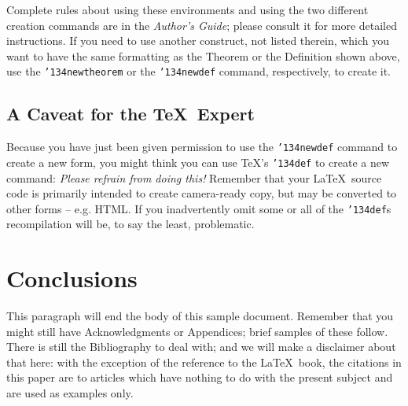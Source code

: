 \documentclass{sig-alternate}
\begin{document}
Complete rules about using these environments and using the
two different creation commands are in the
\textit{Author's Guide}; please consult it for more
detailed instructions.  If you need to use another construct,
not listed therein, which you want to have the same
formatting as the Theorem
or the Definition\cite{salas:calculus} shown above,
use the \texttt{{\char'134}newtheorem} or the
\texttt{{\char'134}newdef} command,
respectively, to create it.

\subsection*{A {\secit Caveat} for the \TeX\ Expert}
Because you have just been given permission to
use the \texttt{{\char'134}newdef} command to create a
new form, you might think you can
use \TeX's \texttt{{\char'134}def} to create a
new command: \textit{Please refrain from doing this!}
Remember that your \LaTeX\ source code is primarily intended
to create camera-ready copy, but may be converted
to other forms -- e.g. HTML. If you inadvertently omit
some or all of the \texttt{{\char'134}def}s recompilation will
be, to say the least, problematic.

\section{Conclusions}
This paragraph will end the body of this sample document.
Remember that you might still have Acknowledgments or
Appendices; brief samples of these
follow.  There is still the Bibliography to deal with; and
we will make a disclaimer about that here: with the exception
of the reference to the \LaTeX\ book, the citations in
this paper are to articles which have nothing to
do with the present subject and are used as
examples only.

\begin{comment}
\section*{Acknowledgments} 
This section is optional; it is a location for you
to acknowledge grants, funding, editing assistance and
what have you.  In the present case, for example, the
authors would like to thank Gerald Murray of ACM for
his help in codifying this \textit{Author's Guide}
and the \textbf{.cls} and \textbf{.tex} files that it describes.
\end{comment}

%

%
%
\end{document}
